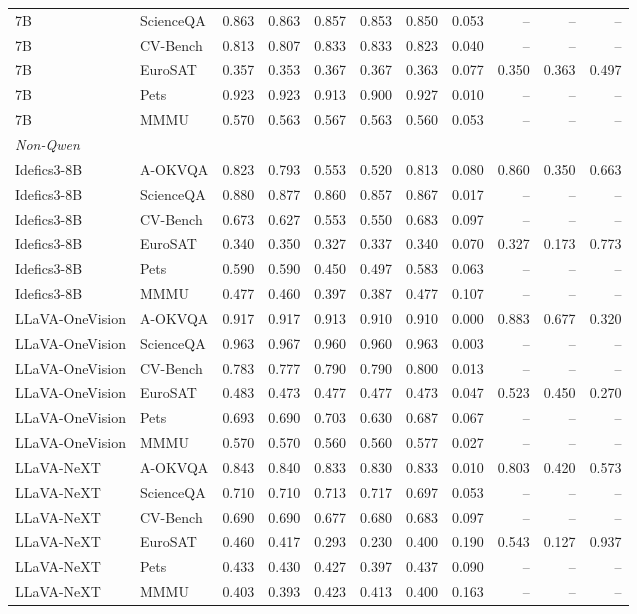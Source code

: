 \begin{tabular}{llrrrrrrrrr}
7B & ScienceQA & 0.863 & 0.863 & 0.857 & 0.853 & 0.850 & 0.053 & -- & -- & -- \\
7B & CV-Bench & 0.813 & 0.807 & 0.833 & 0.833 & 0.823 & 0.040 & -- & -- & -- \\
7B & EuroSAT & 0.357 & 0.353 & 0.367 & 0.367 & 0.363 & 0.077 & 0.350 & 0.363 & 0.497 \\
7B & Pets & 0.923 & 0.923 & 0.913 & 0.900 & 0.927 & 0.010 & -- & -- & -- \\
7B & MMMU & 0.570 & 0.563 & 0.567 & 0.563 & 0.560 & 0.053 & -- & -- & -- \\
\midrule
\multicolumn{11}{l}{\textit{Non-Qwen}} \\
Idefics3-8B & A-OKVQA & 0.823 & 0.793 & 0.553 & 0.520 & 0.813 & 0.080 & 0.860 & 0.350 & 0.663 \\
Idefics3-8B & ScienceQA & 0.880 & 0.877 & 0.860 & 0.857 & 0.867 & 0.017 & -- & -- & -- \\
Idefics3-8B & CV-Bench & 0.673 & 0.627 & 0.553 & 0.550 & 0.683 & 0.097 & -- & -- & -- \\
Idefics3-8B & EuroSAT & 0.340 & 0.350 & 0.327 & 0.337 & 0.340 & 0.070 & 0.327 & 0.173 & 0.773 \\
Idefics3-8B & Pets & 0.590 & 0.590 & 0.450 & 0.497 & 0.583 & 0.063 & -- & -- & -- \\
Idefics3-8B & MMMU & 0.477 & 0.460 & 0.397 & 0.387 & 0.477 & 0.107 & -- & -- & -- \\
LLaVA-OneVision & A-OKVQA & 0.917 & 0.917 & 0.913 & 0.910 & 0.910 & 0.000 & 0.883 & 0.677 & 0.320 \\
LLaVA-OneVision & ScienceQA & 0.963 & 0.967 & 0.960 & 0.960 & 0.963 & 0.003 & -- & -- & -- \\
LLaVA-OneVision & CV-Bench & 0.783 & 0.777 & 0.790 & 0.790 & 0.800 & 0.013 & -- & -- & -- \\
LLaVA-OneVision & EuroSAT & 0.483 & 0.473 & 0.477 & 0.477 & 0.473 & 0.047 & 0.523 & 0.450 & 0.270 \\
LLaVA-OneVision & Pets & 0.693 & 0.690 & 0.703 & 0.630 & 0.687 & 0.067 & -- & -- & -- \\
LLaVA-OneVision & MMMU & 0.570 & 0.570 & 0.560 & 0.560 & 0.577 & 0.027 & -- & -- & -- \\
LLaVA-NeXT & A-OKVQA & 0.843 & 0.840 & 0.833 & 0.830 & 0.833 & 0.010 & 0.803 & 0.420 & 0.573 \\
LLaVA-NeXT & ScienceQA & 0.710 & 0.710 & 0.713 & 0.717 & 0.697 & 0.053 & -- & -- & -- \\
LLaVA-NeXT & CV-Bench & 0.690 & 0.690 & 0.677 & 0.680 & 0.683 & 0.097 & -- & -- & -- \\
LLaVA-NeXT & EuroSAT & 0.460 & 0.417 & 0.293 & 0.230 & 0.400 & 0.190 & 0.543 & 0.127 & 0.937 \\
LLaVA-NeXT & Pets & 0.433 & 0.430 & 0.427 & 0.397 & 0.437 & 0.090 & -- & -- & -- \\
LLaVA-NeXT & MMMU & 0.403 & 0.393 & 0.423 & 0.413 & 0.400 & 0.163 & -- & -- & -- \\
\bottomrule
\end{tabular}
